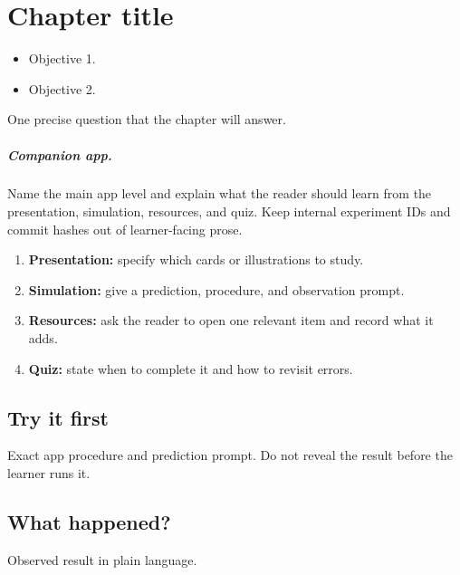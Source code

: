 \chapter{Chapter title}
\label{chap:short-label}

\begin{learningobjectives}
\begin{itemize}
  \item Objective 1.
  \item Objective 2.
\end{itemize}
\end{learningobjectives}

\begin{openingquestion}
One precise question that the chapter will answer.
\end{openingquestion}

\paragraph{Companion app.}
Name the main app level and explain what the reader should learn from the presentation, simulation, resources, and quiz. Keep internal experiment IDs and commit hashes out of learner-facing prose.

\begin{appactivity}
\begin{enumerate}
  \item \textbf{Presentation:} specify which cards or illustrations to study.
  \item \textbf{Simulation:} give a prediction, procedure, and observation prompt.
  \item \textbf{Resources:} ask the reader to open one relevant item and record what it adds.
  \item \textbf{Quiz:} state when to complete it and how to revisit errors.
\end{enumerate}
\end{appactivity}

\section{Try it first}
\begin{tryit}
Exact app procedure and prediction prompt. Do not reveal the result before the learner runs it.
\end{tryit}

\section{What happened?}
Observed result in plain language.

